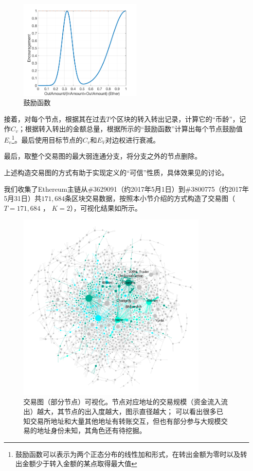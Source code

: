 \begin{figure}[h]
\centering
	\includegraphics[width=0.55\textwidth]{figs/encouragement_en.png}
	\caption{鼓励函数}\label{fig:encouragement}
\end{figure}

接着，对每个节点，根据其在过去$T$个区块的转入转出记录，计算它的“币龄”，记作$C_v$；根据转入转出的金额总量，根据所示的“鼓励函数”计算出每个节点鼓励值$E_v$\footnote{鼓励函数可以表示为两个正态分布的线性加和形式，在转出金额为零时以及转出金额少于转入金额的某点取得最大值}。最后使用目标节点的$C_v$和$E_V$对边权进行衰减。

最后，取整个交易图的最大弱连通分支，将分支之外的节点删除。

上述构造交易图的方式有助于实现定义的“可信”性质，具体效果见的讨论。

我们收集了Ethereum主链从\#3629091（约2017年5月1日）到\#3800775（约2017年5月31日）共$171,684$条区块交易数据，按照本小节介绍的方式构造了交易图（$T=171,684$ ， $K=2$），可视化结果如所示。

\begin{figure}[h]
	\centering
	\includegraphics[width=0.85\textwidth]{figs/wgc1.png}
  \caption{交易图（部分节点）可视化。\small{节点对应地址的交易规模（资金流入流出）越大，其节点的出入度越大，图示直径越大；
      可以看出很多已知交易所地址和大量其他地址有转账交互，但也有部分参与大规模交易的地址身份未知，其角色还有待挖掘。}}\label{fig:wgc}
\end{figure}

